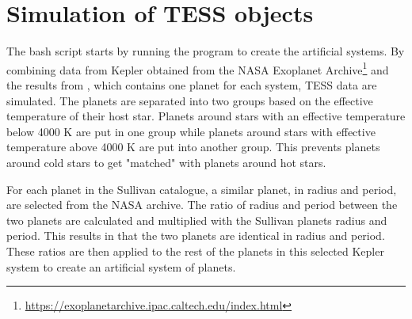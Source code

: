 \documentclass[12pt]{report}
\begin{document}
\section{Simulation of TESS objects}
\label{simTESS}
	The bash script starts by running the program to create the artificial systems. By combining data from Kepler obtained from the NASA Exoplanet Archive\footnote{\url{https://exoplanetarchive.ipac.caltech.edu/index.html}} and the results from \cite{2015ApJ...809...77S}, which contains one planet for each system, TESS data are simulated. The planets are separated into two groups based on the effective temperature of their host star. Planets around stars with an effective temperature below 4000 K are put in one group while planets around stars with effective temperature above 4000 K are put into another group. This prevents planets around cold stars to get "matched" with planets around hot stars. 
	
	For each planet in the Sullivan catalogue, a similar planet, in radius and period, are selected from the NASA archive. The ratio of radius and period between the two planets are calculated and multiplied with the Sullivan planets radius and period. This results in that the two planets are identical in radius and period. These ratios are then applied to the rest of the planets in this selected Kepler system to create an artificial system of planets.  
	
\end{document}
